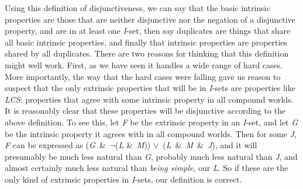 Using this definition of disjunctiveness, we can say that the basic intrinsic properties are those that are neither disjunctive nor the negation of a disjunctive property, and are in at least one \textit{I}\nobreakdash-set, then say duplicates are things that share all basic intrinsic properties, and finally that intrinsic properties are properties shared by all duplicates. There are two reasons for thinking that this definition might well work. First, as we have seen it handles a wide range of hard cases. More importantly, the way that the hard cases were falling gave us reason to suspect that the only extrinsic properties that will be in \textit{I}\nobreakdash-sets are properties like \textit{LCS}: properties that agree with some intrinsic property in all compound worlds. It is reasonably clear that these properties will be disjunctive according to the above definition. To see this, let \textit{F} be the extrinsic property in an \textit{I}\nobreakdash-set, and let \textit{G} be the intrinsic property it agrees with in all compound worlds. Then for some \textit{J}, \textit{F} can be expressed as (\textit{G}~\&~${\lnot}$(\textit{L} \&~\textit{M})) ${\vee}$~(\textit{L}~\&~\textit{M}~\&~\textit{J}), and it will presumably be much less natural than \textit{G}, probably much less natural than \textit{J}, and almost certainly much less natural than \textit{being simple}, our \textit{L}. So if these are the only kind of extrinsic properties in \textit{I}\nobreakdash-sets, our definition is correct.

